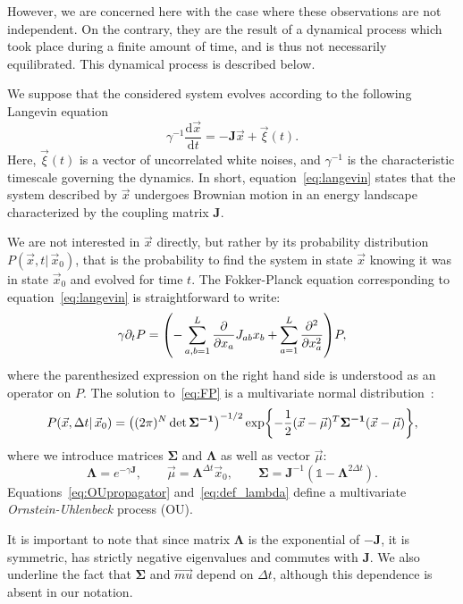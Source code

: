 \documentclass[preprint,amsmath,amssymb,superscriptaddress,showpacs,pre]{revtex4-1}
\let\originalleft\left
\let\originalright\right
\renewcommand{\left}{\mathopen{}\mathclose\bgroup\originalleft}
\renewcommand{\right}{\aftergroup\egroup\originalright}
\def\vx{\vec x}
\newcommand{\Lam}{\bm{\Lambda}}
\newcommand{\Sig}{\bm{\Sigma}}
\newcommand{\curlynormal}[1]{\exp\left\{-\frac{1}{2} #1 \right\}}
\newcommand{\iSig}{\bm{\Sigma^{-1}}}
\begin{document}
However, we are concerned here with the case where these observations are not independent. 
On the contrary, they are the result of a dynamical process which took place during a finite amount of time, and is thus not necessarily equilibrated. 
This dynamical process is described below.

We suppose that the considered system evolves according to the following Langevin equation 
\begin{equation}
	\gamma^{-1}\frac{\text{d}\vx}{\text{d}t} = - \bm{J}\vx + \vec{\xi}(t).
	\label{eq:langevin}
\end{equation}
Here, $\vec{\xi}(t)$ is a vector of uncorrelated white noises, and $\gamma^{-1}$ is the characteristic timescale governing the dynamics. 
In short, equation~\ref{eq:langevin} states that the system described by $\vx$ undergoes Brownian motion in an energy landscape characterized by the coupling matrix $\bm{J}$. 

We are not interested in $\vx$ directly, but rather by its probability distribution $P(\vx,t\vert\,\vx_0)$, that is the probability to find the system in state $\vx$ knowing it was in state $\vx_0$ and evolved for time $t$. 
The Fokker-Planck equation corresponding to equation~\ref{eq:langevin} is straightforward to write: 
\begin{equation}
	\gamma \partial_t P = \left(-\sum_{a,b=1}^L\frac{\partial}{\partial x_a} J_{ab}x_b + \sum_{a=1}^L\frac{\partial^2}{\partial x_a^2}\right) P, 
	\label{eq:FP}
\end{equation}
where the parenthesized expression on the right hand side is understood as an operator on $P$. 
The solution to~\ref{eq:FP} is a multivariate normal distribution~\cite{singh2017multiOU}:
\begin{equation}
	P(\vx, \Delta t|\, \vx_0) = \left((2\pi)^N\det\iSig\right)^{-1/2}
	\curlynormal{(\vx-\vec{\mu})^T\iSig(\vx- \vec{\mu})},
	\label{eq:OUpropagator}
\end{equation}
where we introduce matrices $\Sig$ and $\Lam$ as well as vector $\vec{\mu}$: 
\begin{equation}
	\Lam = e^{-\gamma\bm{J}}, \qquad \vec{\mu} = \Lam^{\Delta t} \vx_0, \qquad \Sig = \bm{J}^{-1}(\mathbb{1} - \Lam^{2\Delta t}).
	\label{eq:def_lambda}
\end{equation}
Equations~\ref{eq:OUpropagator} and~\ref{eq:def_lambda} define a multivariate \emph{Ornstein-Uhlenbeck} process (OU). 

It is important to note that since matrix $\Lam$  is the exponential of $-\bm{J}$, it is symmetric, has strictly negative eigenvalues and commutes with $\bm{J}$. 
We also underline the fact that $\Sig$ and $\vec{mu}$ depend on $\Delta t$, although this dependence is absent in our notation. 
\end{document}
